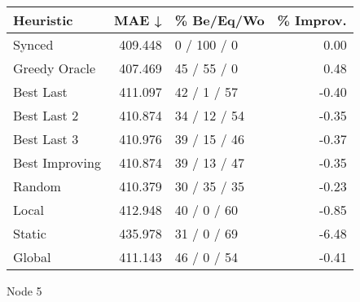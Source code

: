\begin{tabular}{lrlr}
\toprule
\textbf{Heuristic} & \textbf{MAE ↓} & \textbf{\% Be/Eq/Wo} & \textbf{\% Improv.} \\
\midrule
            Synced &        409.448 &          0 / 100 / 0 &                0.00 \\
     Greedy Oracle &        407.469 &          45 / 55 / 0 &                0.48 \\
         Best Last &        411.097 &          42 / 1 / 57 &               -0.40 \\
       Best Last 2 &        410.874 &         34 / 12 / 54 &               -0.35 \\
       Best Last 3 &        410.976 &         39 / 15 / 46 &               -0.37 \\
    Best Improving &        410.874 &         39 / 13 / 47 &               -0.35 \\
            Random &        410.379 &         30 / 35 / 35 &               -0.23 \\
             Local &        412.948 &          40 / 0 / 60 &               -0.85 \\
            Static &        435.978 &          31 / 0 / 69 &               -6.48 \\
            Global &        411.143 &          46 / 0 / 54 &               -0.41 \\
\bottomrule
\end{tabular}
\caption{Node 5}
\label{tab:non_lr05_le1_bs4_5}
